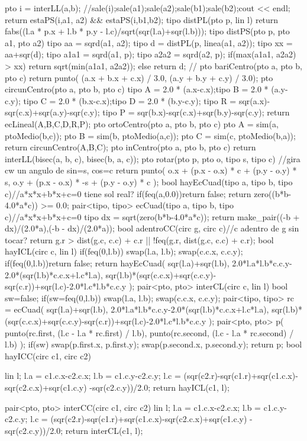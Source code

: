 \documentclass[10pt,landscape,twocolumn,a4paper,notitlepage]{article}
\begin{document}
\begin{code}
{  pto i = interLL(a,b);
  //sale(i);sale(a1);sale(a2);sale(b1);sale(b2);cout << endl;
  return estaPS(i,a1, a2) && estaPS(i,b1,b2);
}
tipo distPL(pto p, lin l){
  return fabs((l.a * p.x + l.b * p.y - l.c)/sqrt(sqr(l.a)+sqr(l.b)));
}
tipo distPS(pto p, pto a1, pto a2){
  tipo aa = sqrd(a1, a2);
  tipo d = distPL(p, linea(a1, a2));
  tipo xx = aa+sqr(d);
  tipo a1a1 = sqrd(a1, p);
  tipo a2a2 = sqrd(a2, p);
  if(max(a1a1, a2a2) > xx){
    return sqrt(min(a1a1, a2a2));
  }else{
    return d;
  }
}
//
pto bariCentro(pto a, pto b, pto c){
  return punto(
    (a.x + b.x + c.x) / 3.0,
    (a.y + b.y + c.y) / 3.0);
}
pto circunCentro(pto a, pto b, pto c){
  tipo A = 2.0 * (a.x-c.x);tipo B = 2.0 * (a.y-c.y);
  tipo C = 2.0 * (b.x-c.x);tipo D = 2.0 * (b.y-c.y);
  tipo R = sqr(a.x)-sqr(c.x)+sqr(a.y)-sqr(c.y);
  tipo P = sqr(b.x)-sqr(c.x)+sqr(b.y)-sqr(c.y);
  return ecLineal(A,B,C,D,R,P);
}
pto ortoCentro(pto a, pto b, pto c){
  pto A = sim(a, ptoMedio(b,c));
  pto B = sim(b, ptoMedio(a,c));
  pto C = sim(c, ptoMedio(b,a));
  return circunCentro(A,B,C);
}
pto inCentro(pto a, pto b, pto c){
  return interLL(bisec(a, b, c), bisec(b, a, c));
}
pto rotar(pto p, pto o, tipo s, tipo c){
  //gira cw un angulo de sin=s, cos=c
  return punto(
    o.x + (p.x - o.x) * c + (p.y - o.y) * s,
    o.y + (p.x - o.x) * -s + (p.y - o.y) * c
  );
}
bool hayEcCuad(tipo a, tipo b, tipo c){//a*x*x+b*x+c=0 tiene sol real?
  if(feq(a,0.0))return false;
  return zero((b*b-4.0*a*c)) >= 0.0;
}
pair<tipo, tipo> ecCuad(tipo a, tipo b, tipo c){//a*x*x+b*x+c=0
  tipo dx = sqrt(zero(b*b-4.0*a*c));
  return make_pair((-b + dx)/(2.0*a),(-b - dx)/(2.0*a));
}
bool adentroCC(circ g, circ c){//c adentro de g sin tocar?
  return g.r > dist(g.c, c.c) + c.r || !feq(g.r, dist(g.c, c.c) + c.r);
}
bool hayICL(circ c, lin l){
  if(feq(0,l.b)){
    swap(l.a, l.b);
    swap(c.c.x, c.c.y);
  }
  if(feq(0,l.b))return false;
  return hayEcCuad(
    sqr(l.a)+sqr(l.b),
    2.0*l.a*l.b*c.c.y-2.0*(sqr(l.b)*c.c.x+l.c*l.a),
    sqr(l.b)*(sqr(c.c.x)+sqr(c.c.y)-sqr(c.r))+sqr(l.c)-2.0*l.c*l.b*c.c.y
  );
}
pair<pto, pto> interCL(circ c, lin l){
  bool sw=false;
  if(sw=feq(0,l.b)){
    swap(l.a, l.b);
    swap(c.c.x, c.c.y);
  }
  pair<tipo, tipo> rc = ecCuad(
    sqr(l.a)+sqr(l.b),
    2.0*l.a*l.b*c.c.y-2.0*(sqr(l.b)*c.c.x+l.c*l.a),
    sqr(l.b)*(sqr(c.c.x)+sqr(c.c.y)-sqr(c.r))+sqr(l.c)-2.0*l.c*l.b*c.c.y
  );
  pair<pto, pto> p(
    punto(rc.first, (l.c - l.a * rc.first) / l.b),
    punto(rc.second, (l.c - l.a * rc.second) / l.b)
  );
  if(sw){
    swap(p.first.x, p.first.y);
    swap(p.second.x, p.second.y);
  }
  return p;
}
bool hayICC(circ c1, circ c2){
  lin l;
  l.a = c1.c.x-c2.c.x;
  l.b = c1.c.y-c2.c.y;
  l.c = (sqr(c2.r)-sqr(c1.r)+sqr(c1.c.x)-sqr(c2.c.x)+sqr(c1.c.y)
    -sqr(c2.c.y))/2.0;
  return hayICL(c1, l);

}
pair<pto, pto> interCC(circ c1, circ c2){
  lin l;
  l.a = c1.c.x-c2.c.x;
  l.b = c1.c.y-c2.c.y;
  l.c = (sqr(c2.r)-sqr(c1.r)+sqr(c1.c.x)-sqr(c2.c.x)+sqr(c1.c.y)
    -sqr(c2.c.y))/2.0;
  return interCL(c1, l);
}
\end{code}
\end{document}
